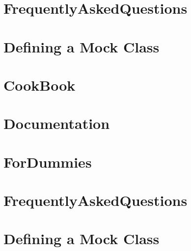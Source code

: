 \documentclass[twoside]{book}
\newcommand{\+}{\discretionary{\mbox{\scriptsize$\hookleftarrow$}}{}{}}
\begin{document}
\chapter{Frequently\+Asked\+Questions}
\label{md_vendor_googletest_googlemock_docs_v1_5_FrequentlyAskedQuestions}
\hypertarget{md_vendor_googletest_googlemock_docs_v1_5_FrequentlyAskedQuestions}{}

\chapter{Defining a Mock Class}
\label{md_vendor_googletest_googlemock_docs_v1_6_CheatSheet}
\hypertarget{md_vendor_googletest_googlemock_docs_v1_6_CheatSheet}{}

\chapter{Cook\+Book}
\label{md_vendor_googletest_googlemock_docs_v1_6_CookBook}
\hypertarget{md_vendor_googletest_googlemock_docs_v1_6_CookBook}{}

\chapter{Documentation}
\label{md_vendor_googletest_googlemock_docs_v1_6_Documentation}
\hypertarget{md_vendor_googletest_googlemock_docs_v1_6_Documentation}{}

\chapter{For\+Dummies}
\label{md_vendor_googletest_googlemock_docs_v1_6_ForDummies}
\hypertarget{md_vendor_googletest_googlemock_docs_v1_6_ForDummies}{}

\chapter{Frequently\+Asked\+Questions}
\label{md_vendor_googletest_googlemock_docs_v1_6_FrequentlyAskedQuestions}
\hypertarget{md_vendor_googletest_googlemock_docs_v1_6_FrequentlyAskedQuestions}{}

\chapter{Defining a Mock Class}
\label{md_vendor_googletest_googlemock_docs_v1_7_CheatSheet}
\hypertarget{md_vendor_googletest_googlemock_docs_v1_7_CheatSheet}{}

\end{document}
